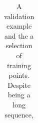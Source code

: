 \begin{table}
\begin{center}
\begin{tabular}{l}
\end{tabular}

\caption{A validation example and the a selection of training points. Despite being a long sequence, }
\end{center}
\end{table}


